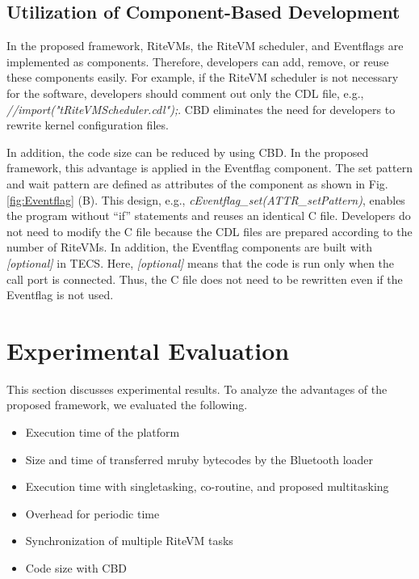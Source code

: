 \documentclass[S,R,E]{article/compsoft}
\begin{document}
 
\subsection{Utilization of Component-Based Development}
In the proposed framework, RiteVMs, the RiteVM scheduler, and Eventflags are implemented as components.
Therefore, developers can add, remove, or reuse these components easily.
For example, if the RiteVM scheduler is not necessary for the software, developers should comment out only the CDL file, e.g., {\it //import("tRiteVMScheduler.cdl");}.
CBD eliminates the need for developers to rewrite kernel configuration files.

In addition, the code size can be reduced by using CBD. 
In the proposed framework, this advantage is applied in the Eventflag component.
The set pattern and wait pattern are defined as attributes of the component as shown in Fig.\ref{fig:Eventflag} (B).
This design, e.g., {\it cEventflag\_set(ATTR\_setPattern)}, enables the program without ``if'' statements and reuses an identical C file.
Developers do not need to modify the C file because the CDL files are prepared according to the number of RiteVMs.
In addition, the Eventflag components are built with {\it [optional]} in TECS.
Here, {\it [optional]} means that the code is run only when the call port is connected.
Thus, the C file does not need to be rewritten even if the Eventflag is not used. 



\section{Experimental Evaluation}
\label{sec:Evaluation}
This section discusses experimental results.
To analyze the advantages of the proposed framework, we evaluated the following.
\begin{itemize}
    \item Execution time of the platform
    \item Size and time of transferred mruby bytecodes by the Bluetooth loader
    \item Execution time with singletasking, co-routine, and proposed multitasking
    \item Overhead for periodic time
    \item Synchronization of multiple RiteVM tasks
    \item Code size with CBD 
\end{itemize}
\end{document}
